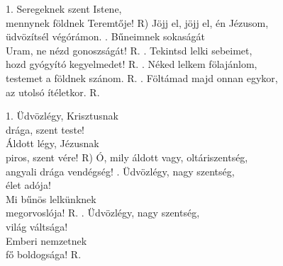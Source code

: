 \documentclass[twoside]{article}
\begin{document}
\begin{hymnstanzas}
  1. Seregeknek szent Istene,\\
  mennynek földnek Teremtője!
\stanzabreak
  R) Jöjj el, jöjj el, én Jézusom,\\
  üdvözítsél végórámon.
. Bűneimnek sokaságát\\
  Uram, ne nézd gonoszságát! R.
. Tekintsd lelki sebeimet,\\
  hozd gyógyító kegyelmedet! R.
. Néked lelkem fölajánlom,\\
  testemet a földnek szánom. R.
. Föltámad majd onnan egykor,\\
  az utolsó ítéletkor. R.
\end{hymnstanzas}

\begin{hymnstanzas}
  1. Üdvözlégy, Krisztusnak\\
  drága, szent teste!\\
  Áldott légy, Jézusnak\\
  piros, szent vére!
\stanzabreak
  R) Ó, mily áldott vagy, oltáriszentség,\\
  angyali drága vendégség!
. Üdvözlégy, nagy szentség,\\
  élet adója!\\
  Mi bűnös lelkünknek\\
  megorvoslója! R.
. Üdvözlégy, nagy szentség,\\
  világ váltsága!\\
  Emberi nemzetnek\\
  fő boldogsága! R.
\end{hymnstanzas}
\end{document}
